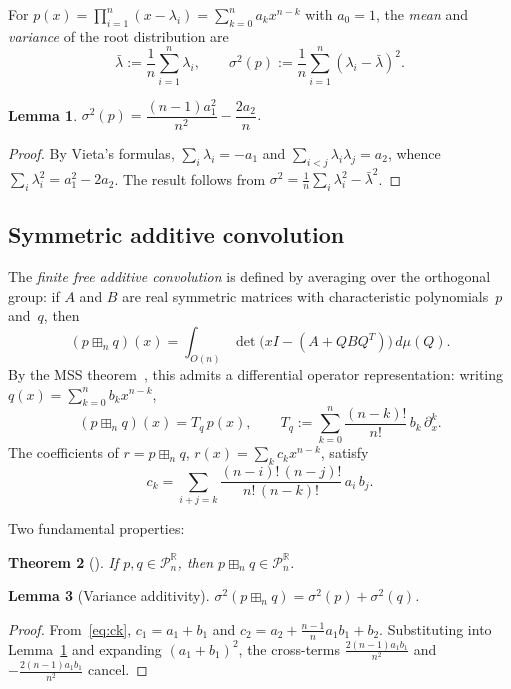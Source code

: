 \documentclass[11pt,a4paper]{amsart}
\theoremstyle{plain}
\newtheorem{theorem}{Theorem}[section]
\newtheorem{lemma}[theorem]{Lemma}
\theoremstyle{definition}
\theoremstyle{remark}
\newcommand{\R}{\mathbb{R}}
\newcommand{\PnR}[1][n]{\mathcal{P}^{\R}_{#1}}
\newcommand{\fp}{\boxplus_n}
\begin{document}
For $p(x)=\prod_{i=1}^n(x-\lambda_i)
=\sum_{k=0}^n a_k x^{n-k}$ with $a_0=1$, the
\emph{mean} and \emph{variance} of the root distribution are
\[
  \bar\lambda:=\frac{1}{n}\sum_{i=1}^n\lambda_i,
  \qquad
  \sigma^2(p):=\frac{1}{n}\sum_{i=1}^n
    (\lambda_i-\bar\lambda)^2.
\]

\begin{lemma}\label{lem:var-coeff}
$\sigma^2(p)=\dfrac{(n-1)a_1^2}{n^2}-\dfrac{2a_2}{n}$.
\end{lemma}

\begin{proof}
By Vieta's formulas, $\sum_i\lambda_i=-a_1$ and
$\sum_{i<j}\lambda_i\lambda_j=a_2$, whence
$\sum_i\lambda_i^2=a_1^2-2a_2$.
The result follows from
$\sigma^2=\frac{1}{n}\sum_i\lambda_i^2-\bar\lambda^2$.
\end{proof}

\subsection{Symmetric additive convolution}

The \emph{finite free additive convolution} is defined by
averaging over the orthogonal group: if $A$ and $B$ are real
symmetric matrices with characteristic polynomials~$p$
and~$q$, then
\[
  (p\fp q)(x)
  =\int_{O(n)}\det\bigl(xI-(A+QBQ^T)\bigr)\,d\mu(Q).
\]
By the MSS theorem~\cite{MSS}, this admits a differential
operator representation: writing
$q(x)=\sum_{k=0}^n b_k x^{n-k}$,
\begin{equation}\label{eq:diff-op}
  (p\fp q)(x)=T_q\,p(x),
  \qquad
  T_q:=\sum_{k=0}^n\frac{(n-k)!}{n!}\,b_k\,\partial_x^k.
\end{equation}
The coefficients of $r=p\fp q$,
$r(x)=\sum_k c_k x^{n-k}$, satisfy
\begin{equation}\label{eq:ck}
  c_k=\sum_{i+j=k}
  \frac{(n-i)!\,(n-j)!}{n!\,(n-k)!}\,a_i\,b_j.
\end{equation}

Two fundamental properties:

\begin{theorem}[\cite{MSS}]\label{thm:mss}
If $p,q\in\PnR$, then $p\fp q\in\PnR$.
\end{theorem}

\begin{lemma}[Variance additivity]\label{lem:var-add}
$\sigma^2(p\fp q)=\sigma^2(p)+\sigma^2(q)$.
\end{lemma}

\begin{proof}
From~\eqref{eq:ck},
$c_1=a_1+b_1$ and
$c_2=a_2+\frac{n-1}{n}a_1 b_1+b_2$.
Substituting into Lemma~\ref{lem:var-coeff} and expanding
$(a_1+b_1)^2$, the cross-terms
$\frac{2(n-1)a_1 b_1}{n^2}$ and
$-\frac{2(n-1)a_1 b_1}{n^2}$ cancel.
\end{proof}
\end{document}
